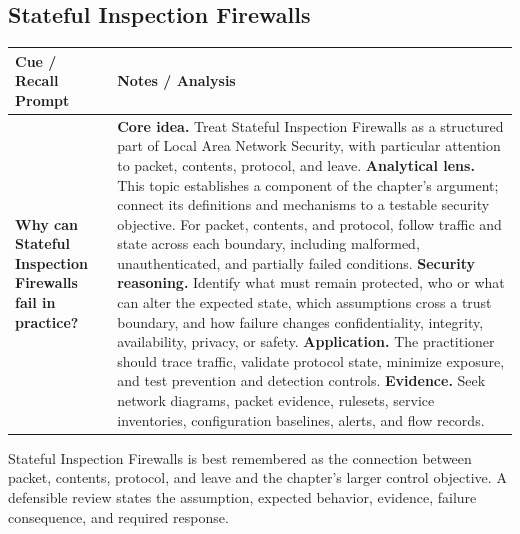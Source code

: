 \documentclass[11pt]{article}
\newcommand{\CornellHeader}{%
\rowcolor{Navy}\color{white}\bfseries Cue / Recall Prompt & \color{white}\bfseries Notes / Analysis\\\hline}
\newcommand{\CornellRow}[2]{%
\cellcolor{CueGray}\RaggedRight\textbf{#1} & \RaggedRight #2\\\hline}
\begin{document}
\subsection*{Stateful Inspection Firewalls}
\begin{longtable}{>{\RaggedRight\arraybackslash}p{}|>{\RaggedRight\arraybackslash}p{}}
\CornellHeader
\CornellRow{Why can Stateful Inspection Firewalls fail in practice?}{\textbf{Core idea.} Treat Stateful Inspection Firewalls as a structured part of Local Area Network Security, with particular attention to packet, contents, protocol, and leave. \textbf{Analytical lens.} This topic establishes a component of the chapter's argument; connect its definitions and mechanisms to a testable security objective. For packet, contents, and protocol, follow traffic and state across each boundary, including malformed, unauthenticated, and partially failed conditions. \textbf{Security reasoning.} Identify what must remain protected, who or what can alter the expected state, which assumptions cross a trust boundary, and how failure changes confidentiality, integrity, availability, privacy, or safety. \textbf{Application.} The practitioner should trace traffic, validate protocol state, minimize exposure, and test prevention and detection controls. \textbf{Evidence.} Seek network diagrams, packet evidence, rulesets, service inventories, configuration baselines, alerts, and flow records.}
\end{longtable}
\begin{topicsummary}
Stateful Inspection Firewalls is best remembered as the connection between packet, contents, protocol, and leave and the chapter's larger control objective. A defensible review states the assumption, expected behavior, evidence, failure consequence, and required response.
\end{topicsummary}
\end{document}
